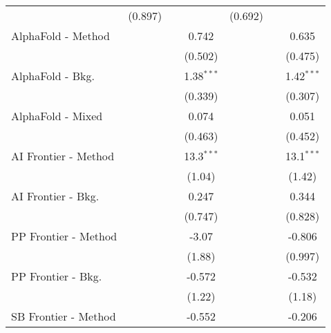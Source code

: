 \begin{tabular}{lcccccc}
                                  & (0.897)        &               &               & (0.692)        &               &   \\   
   AlphaFold - Method             &                &               & 0.742         &                &               & 0.635\\   
                                  &                &               & (0.502)       &                &               & (0.475)\\   
   AlphaFold - Bkg.               &                &               & 1.38$^{***}$  &                &               & 1.42$^{***}$\\   
                                  &                &               & (0.339)       &                &               & (0.307)\\   
   AlphaFold - Mixed              &                &               & 0.074         &                &               & 0.051\\   
                                  &                &               & (0.463)       &                &               & (0.452)\\   
   AI Frontier - Method           &                &               & 13.3$^{***}$  &                &               & 13.1$^{***}$\\   
                                  &                &               & (1.04)        &                &               & (1.42)\\   
   AI Frontier - Bkg.             &                &               & 0.247         &                &               & 0.344\\   
                                  &                &               & (0.747)       &                &               & (0.828)\\   
   PP Frontier - Method           &                &               & -3.07         &                &               & -0.806\\   
                                  &                &               & (1.88)        &                &               & (0.997)\\   
   PP Frontier - Bkg.             &                &               & -0.572        &                &               & -0.532\\   
                                  &                &               & (1.22)        &                &               & (1.18)\\   
   SB Frontier - Method           &                &               & -0.552        &                &               & -0.206\\   

\end{tabular}
